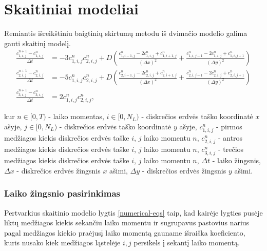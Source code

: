 \documentclass{article}
\begin{document}
\newpage
\section{Skaitiniai modeliai}

Remiantis išreikštiniu baigtinių skirtumų metodu iš dvimačio modelio galima gauti skaitinį modelį.
\begin{subequations} \label{numerical-eqs}
\begin{align}
\frac{c^{n+1}_{1,i,j}-c^n_{1,i,j}}{\Delta t}&=
-3c^{n}_{1,i,j}c^{n}_{2,i,j}
+D\left(\frac{c^n_{1,i-1,j}-2c^n_{1,i,j}+c^n_{1,i+1,j}}{(\Delta x)^2}+\frac{c^n_{1,i,j-1}-2c^n_{1,i,j}+c^n_{1,i,j+1}}{(\Delta y)^2}\right)\\
\frac{c^{n+1}_{2,i,j}-c^n_{2,i,j}}{\Delta t}&=
-5c^{n}_{1,i,j}c^{n}_{2,i,j}
+D\left(\frac{c^n_{2,i-1,j}-2c^n_{2,i,j}+c^n_{2,i+1,j}}{(\Delta x)^2}+\frac{c^n_{2,i,j-1}-2c^n_{2,i,j}+c^n_{2,i,j+1}}{(\Delta y)^2}\right)\\
\frac{c^{n+1}_{3,i,j}-c^n_{3,i,j}}{\Delta t}&=2c^{n}_{1,i,j}c^{n}_{2,i,j},
\end{align}
\end{subequations}

kur $n\in[0, T)$ - laiko momentas, 
$i\in[0,N_L)$ - diskrečios erdvės taško koordinatė $x$ ašyje,
$j\in[0,N_L)$ - diskrečios erdvės taško koordinatė $y$ ašyje,
$c^n_{1,i,j}$ - pirmos medžiagos kiekis diskrečios erdvės taške $i$, $j$ laiko momentu $n$,
$c^n_{2,i,j}$ - antros medžiagos kiekis diskrečios erdvės taške $i$, $j$ laiko momentu $n$,
$c^n_{3,i,j}$ - trečios medžiagos kiekis diskrečios erdvės taške $i$, $j$ laiko momentu $n$,
$\Delta t$ - laiko žingsnis,
$\Delta x$ - diskrečios erdvės žingsnis $x$ ašimi,
$\Delta y$ - diskrečios erdvės žingsnis $y$ ašimi.

\newpage
\subsubsection{Laiko žingsnio pasirinkimas}

Pertvarkius skaitinio modelio lygtis \eqref{numerical-eqs} taip, kad kairėje lygties pusėje liktų 
medžiagos kiekis sekančiu laiko momentu ir sugrupavus pastovius narius pagal medžiagos kiekio
praėjusį laiko momentą gauname išraiška koeficiento, kuris nusako kiek medžiagos
ląstelėje $i,j$ persikels į sekantį laiko momentą.     
\end{document}
